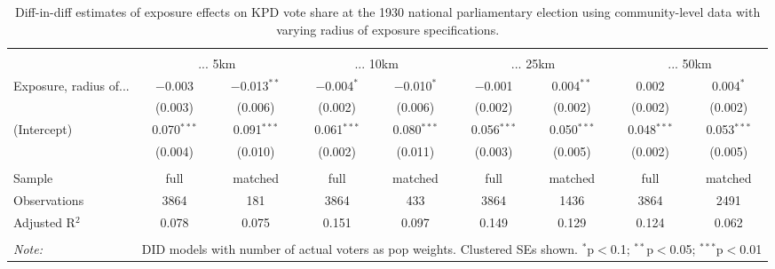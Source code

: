 
\begin{table}[!htbp] \centering 
  \caption{Diff-in-diff estimates of exposure effects on KPD vote share at the 1930 national parliamentary election using community-level data with varying radius of exposure specifications.\vspace{-.25cm}} 
  \label{tab:voteshare-kpd-radius-dd} 
\scriptsize 
\begin{tabular}{@{\extracolsep{5pt}}lcccccccc} 
\\[-1.8ex]\hline 
\hline \\[-1.8ex] 
 & \multicolumn{2}{c}{... 5km} & \multicolumn{2}{c}{... 10km} & \multicolumn{2}{c}{... 25km} & \multicolumn{2}{c}{... 50km} \\ 
 \cmidrule(r){2-3}\cmidrule(r){4-5}\cmidrule(r){6-7}\cmidrule(r){8-9}Exposure, radius of... & $-$0.003 & $-$0.013$^{**}$ & $-$0.004$^{*}$ & $-$0.010$^{*}$ & $-$0.001 & 0.004$^{**}$ & 0.002 & 0.004$^{*}$ \\ 
  & (0.003) & (0.006) & (0.002) & (0.006) & (0.002) & (0.002) & (0.002) & (0.002) \\ 
  (Intercept) & 0.070$^{***}$ & 0.091$^{***}$ & 0.061$^{***}$ & 0.080$^{***}$ & 0.056$^{***}$ & 0.050$^{***}$ & 0.048$^{***}$ & 0.053$^{***}$ \\ 
  & (0.004) & (0.010) & (0.002) & (0.011) & (0.003) & (0.005) & (0.002) & (0.005) \\ 
 \hline \\[-1.8ex] 
Sample & full & matched & full & matched & full & matched & full & matched \\ 
Observations & 3864 & 181 & 3864 & 433 & 3864 & 1436 & 3864 & 2491 \\ 
Adjusted R$^{2}$ & 0.078 & 0.075 & 0.151 & 0.097 & 0.149 & 0.129 & 0.124 & 0.062 \\ 
\hline 
\hline \\[-1.8ex] 
\textit{Note:}  & \multicolumn{8}{r}{DID models with number of actual voters as pop weights. Clustered SEs shown. $^{*}$p$<$0.1; $^{**}$p$<$0.05; $^{***}$p$<$0.01} \\ 
\end{tabular} 
\end{table} 
